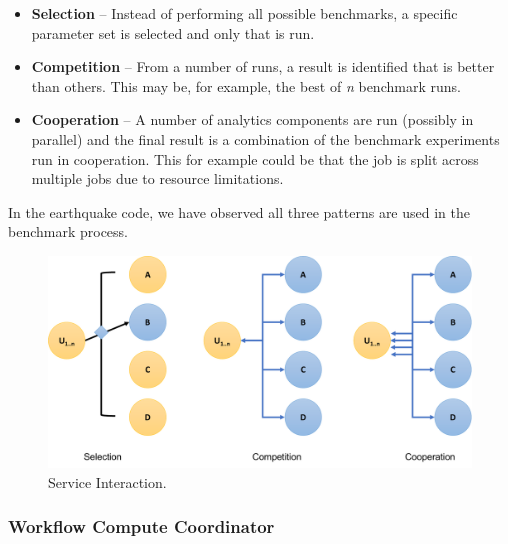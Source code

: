 \documentclass[utf8]{FrontiersinVancouver} %
\begin{document}
\begin{itemize}
\item {\bf Selection} -- Instead of performing all possible benchmarks,  a specific parameter set is selected and only that is run.  \item {\bf Competition} -- From a number of runs, a result is identified that is better than others. This may be, for example, the best of {\em n} benchmark runs.
\item {\bf Cooperation} -- A number of analytics components are run  (possibly in parallel) and the final result is a combination of the benchmark experiments run in cooperation. This for example could be that the job is split across multiple jobs due to resource limitations.
\end{itemize}

In the earthquake code, we have observed all three patterns are used in the benchmark process.

\begin{figure}[htb]
\centering\includegraphics[width=0.75\columnwidth]{images/processes-nist}
\caption{Service Interaction.}
\label{fig:service-interaction}
\end{figure}




\subsubsection{Workflow Compute Coordinator}
\label{sec:workflow-cc}

\end{document}

